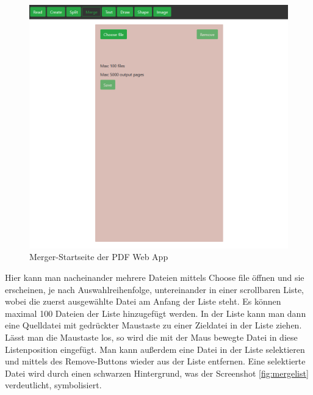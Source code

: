 \begin{figure}[!htbp]
	\centering
	\includegraphics[width=1\textwidth]{"images/merger.png"}
	\caption{Merger-Startseite der PDF Web App}
	\label{fig:merger}
\end{figure}

Hier kann man nacheinander mehrere Dateien mittels Choose file öffnen und sie erscheinen, je nach Auswahlreihenfolge, untereinander in einer scrollbaren Liste, wobei die zuerst ausgewählte Datei am Anfang der Liste steht. Es können maximal 100 Dateien der Liste hinzugefügt werden. In der Liste kann man dann eine Quelldatei mit gedrückter Maustaste zu einer Zieldatei in der Liste ziehen. Lässt man die Maustaste los, so wird die mit der Maus bewegte Datei in diese Listenposition eingefügt. Man kann außerdem eine Datei in der Liste selektieren und mittels des Remove-Buttons wieder aus der Liste entfernen. Eine selektierte Datei wird durch einen schwarzen Hintergrund, was der Screenshot \ref{fig:mergelist} verdeutlicht, symbolisiert.

